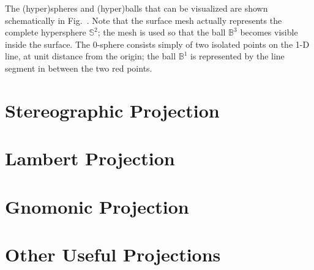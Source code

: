The (hyper)spheres and (hyper)balls that can be visualized are shown schematically in Fig.~.  Note that the surface mesh actually represents the complete hypersphere $\mathbb{S}^2$; the mesh is used so that the ball $\mathbb{B}^3$ becomes visible inside the surface. The $0$-sphere consists simply of two isolated points on the 1-D line, at unit distance from the origin; the ball $\mathbb{B}^1$ is represented by the line segment in between the two red points.


\section{Stereographic Projection}



\section{Lambert Projection}



\section{Gnomonic Projection}




\section{Other Useful Projections}













